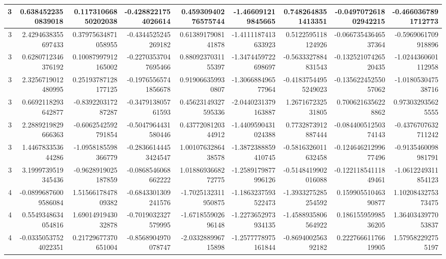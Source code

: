 \documentclass{jlreq}
\numberwithin{equation}{section}
\begin{document}
\begin{table}[H]
{\begin{tabular}{|r|r|r|r|r|r|r|r|r|}
      3 & 0.6384522350839018    & 0.11731066850202038   & -0.4288221754026614  & 0.45930940276575744  & -1.466091219845665    & 0.7482648351413351    & -0.049707261802942215 & -0.4660367891712773   \\ \hline
      3 & 2.4294638355697433    & 0.37975634871058955   & -0.4344525245269182  & 0.6138917908141878   & -1.4111187413633923   & 0.5122595118124926    & -0.06673543646537364  & -0.5969061709918896   \\ \hline
      3 & 0.6280712346376192    & 0.10087997912165002   & -0.22703537047695466 & 0.8809237031155397   & -1.3474459722698697   & -0.5633327884831543   & -0.13252107426520435  & -1.0244360601112958   \\ \hline
      3 & 2.3256719012480995    & 0.25193787128177125   & -0.19765565741856678 & 0.919066359930807    & -1.306688496577964    & -0.41837544955249023  & -0.13562245255057062  & -1.018053047538716    \\ \hline
      3 & 0.6692118293642877    & -0.839220317287287    & -0.347913805761593   & 0.45623149327595336  & -2.0440231379163887   & 1.267167232531805     & 0.7006216356228862    & 0.973032935625555     \\ \hline
      3 & 2.2889219829666363    & -0.6062542592791854   & -0.5047964431580446  & 0.4377208120344912   & -1.4409590431024388   & 0.7732873912887444    & -0.08440051250374143  & -0.4376707632711242   \\ \hline
      3 & 1.446783353644286     & -1.0958185598366779   & -0.28366144453424547 & 1.0010763286438578   & -1.3872388859410745   & -0.5816326011632458   & -0.12464621299677496  & -0.9135460098981791   \\ \hline
      3 & 3.1999739519345436    & -0.9628919025187859   & -0.0868546068662222  & 1.0188693668272775   & -1.2589179877996126   & -0.5148419902016088   & -0.12211854111849461  & -1.0612249311854123   \\ \hline
      4 & -0.08996876009586084  & 1.5156617847809382    & -0.6843301309241576  & -1.7025132311950875  & -1.1863237593522473   & -1.3933275285254592   & 0.15990551046390877   & 1.1020843275373475    \\ \hline
      4 & 0.5549348634054816    & 1.6901491943032878    & -0.7019032327579995  & -1.671855902696148   & -1.2273652973934135   & -1.4588935806564922   & 0.18615595998536205   & 1.3640343977053837    \\ \hline
      4 & -0.03350537524022351  & 0.21729677370651004   & -0.8568904970078747  & -2.033288996715898   & -1.2577778975161844   & -0.869400256392182    & 0.22276661176619905   & 1.579582292755197     \\ \hline

\end{tabular}}
\end{table}
\end{document}
